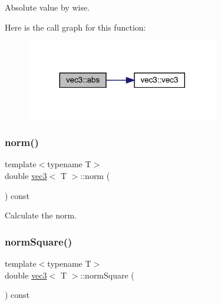 Absolute value by wise. 

Here is the call graph for this function\+:\nopagebreak
\begin{figure}[H]
\begin{center}
\leavevmode
\includegraphics[width=239pt]{structvec3_abf0d30ac0a81beeacd36ddc86ec6ee83_cgraph}
\end{center}
\end{figure}
\mbox{\label{structvec3_a4cd4c90ed137753d0b6a2e83bb0170f7}} 
\subsubsection{\texorpdfstring{norm()}{norm()}}
{\footnotesize\ttfamily template$<$typename T$>$ \\
double \mbox{\hyperlink{structvec3}{vec3}}$<$ T $>$\+::norm (\begin{DoxyParamCaption}{ }\end{DoxyParamCaption}) const\hspace{0.3cm}{\ttfamily [inline]}}



Calculate the norm. 

\mbox{\label{structvec3_a2441867c3e439981a865affd7cbcc09c}} 
\subsubsection{\texorpdfstring{norm\+Square()}{normSquare()}}
{\footnotesize\ttfamily template$<$typename T$>$ \\
double \mbox{\hyperlink{structvec3}{vec3}}$<$ T $>$\+::norm\+Square (\begin{DoxyParamCaption}{ }\end{DoxyParamCaption}) const\hspace{0.3cm}{\ttfamily [inline]}}



